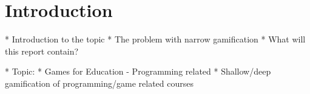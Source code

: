 \section{Introduction}
* Introduction to the topic
* The problem with narrow gamification
* What will this report contain?

    * Topic: 
    * Games for Education - Programming related
        * Shallow/deep gamification of programming/game related courses